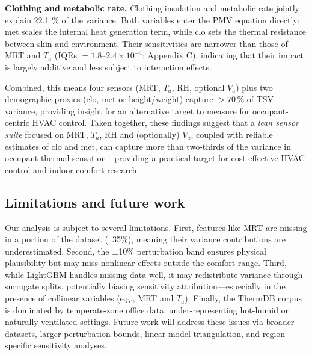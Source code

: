\documentclass{article}
\theoremstyle{plain}
\theoremstyle{definition}
\theoremstyle{remark}
\begin{document}
\textbf{Clothing and metabolic rate.}  
Clothing insulation and metabolic rate jointly explain 22.1 \% of the
variance. Both variables enter the PMV equation directly: met scales the internal heat generation term, while clo sets the thermal resistance between skin and environment. Their sensitivities are narrower than those of MRT and $T_a$ (IQRs $=1.8$–$2.4{\times}10^{-4}$; Appendix C), indicating that their impact is largely additive and less subject to interaction effects.

Combined, this means four sensors (MRT, $T_a$, RH, optional $V_a$) plus two demographic proxies (clo, met or height/weight) capture $>\!70\,\%$ of TSV variance, providing insight for an alternative target to measure for occupant-centric HVAC control. Taken together, these findings suggest that a \emph{lean sensor suite} focused on MRT, $T_a$, RH and (optionally) $V_a$, coupled with reliable estimates of clo and met, can capture more than two-thirds of the variance in occupant thermal  sensation—providing a practical target for cost-effective HVAC control and indoor-comfort research. 

\subsection{Limitations and future work}\label{ssec:limits}
Our analysis is subject to several limitations. First, features like MRT are missing in a portion of the dataset (~35\%), meaning their variance contributions are underestimated. Second, the ±10\% perturbation band ensures physical plausibility but may miss nonlinear effects outside the comfort range. Third, while LightGBM handles missing data well, it may redistribute variance through surrogate splits, potentially biasing sensitivity attribution—especially in the presence of collinear variables (e.g., MRT and $T_a$). Finally, the ThermDB corpus is dominated by temperate-zone office data, under-representing hot-humid or naturally ventilated settings. Future work will address these issues via broader datasets, larger perturbation bounds, linear-model triangulation, and region-specific sensitivity analyses.

\end{document}
